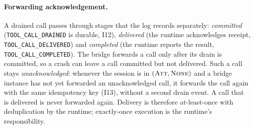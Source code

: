 \paragraph{Forwarding acknowledgement.} A drained call passes through
stages that the log records separately: \emph{committed}
(\texttt{TOOL\_CALL\_DRAINED} is durable, I12), \emph{delivered} (the
runtime acknowledges receipt, \texttt{TOOL\_CALL\_DELIVERED}) and
\emph{completed} (the runtime reports the result,
\texttt{TOOL\_CALL\_COMPLETED}). The bridge forwards a call only after
its drain is committed, so a crash can leave a call committed but not
delivered. Such a call stays \emph{unacknowledged}: whenever the session is
in $(\textsc{Att},\textsc{None})$ and a bridge instance has not yet
forwarded an unacknowledged call, it forwards the call again with the
same idempotency key (I13), without a second drain event. A call that is
delivered is never forwarded again. Delivery is therefore at-least-once
with deduplication by the runtime; exactly-once execution is the runtime's
responsibility.

